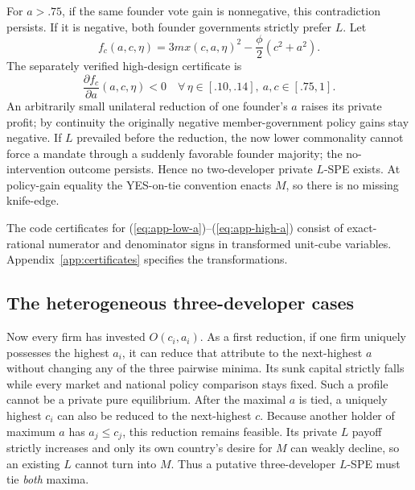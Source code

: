 For \(a>.75\), if the same founder vote gain is nonnegative, this contradiction persists. If it is negative, both founder governments strictly prefer \(L\). Let
\[
 f_c(a,c,\eta)
 =3m x(c,a,\eta)^2-\frac{\phi}{2}(c^2+a^2).
\]
The separately verified high-design certificate is
\begin{equation}
 \frac{\partial f_c}{\partial a}(a,c,\eta)<0
 \quad \forall\,\eta\in[.10,.14],\
 a,c\in[.75,1].
 \label{eq:app-high-a}
\end{equation}
An arbitrarily small unilateral reduction of one founder's \(a\) raises its private profit; by continuity the originally negative member-government policy gains stay negative. If \(L\) prevailed before the reduction, the now lower commonality cannot force a mandate through a suddenly favorable founder majority; the no-intervention outcome persists. Hence no two-developer private \(L\)-SPE exists. At policy-gain equality the YES-on-tie convention enacts \(M\), so there is no missing knife-edge.

The code certificates for (\ref{eq:app-low-a})--(\ref{eq:app-high-a}) consist of exact-rational numerator and denominator signs in transformed unit-cube variables. Appendix~\ref{app:certificates} specifies the transformations.

\subsection{The heterogeneous three-developer cases}\label{app:global}

Now every firm has invested \(O(c_i,a_i)\). As a first reduction, if one firm uniquely possesses the highest \(a_i\), it can reduce that attribute to the next-highest \(a\) without changing any of the three pairwise minima. Its sunk capital strictly falls while every market and national policy comparison stays fixed. Such a profile cannot be a private pure equilibrium. After the maximal \(a\) is tied, a uniquely highest \(c_i\) can also be reduced to the next-highest \(c\). Because another holder of maximum \(a\) has \(a_j\le c_j\), this reduction remains feasible. Its private \(L\) payoff strictly increases and only its own country's desire for \(M\) can weakly decline, so an existing \(L\) cannot turn into \(M\). Thus a putative three-developer \(L\)-SPE must tie \emph{both} maxima.

